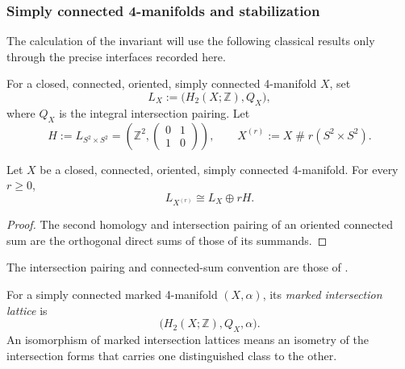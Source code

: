 \subsubsection{Simply connected 4-manifolds and stabilization}
\label{subsec:low-dimensional-topology}

The calculation of the invariant will use the following classical results
only through the precise interfaces recorded here.

\begin{definition}
\label{def:intersection-lattice-stabilization}
For a closed, connected, oriented, simply connected 4-manifold $X$, set
\[
  L_X:=\bigl(H_2(X;\mathbb Z),Q_X\bigr),
\]
where $Q_X$ is the integral intersection pairing.  Let
\[
  H:=L_{S^2\times S^2}
   =\left(\mathbb Z^2,
      \begin{pmatrix}0&1\\1&0\end{pmatrix}\right),
  \qquad
  X^{(r)}:=X\mathbin{\#}r(S^2\times S^2).
\]
\end{definition}

\begin{lemma}
\label{lem:intersection-lattice-stabilization}
Let \(X\) be a closed, connected, oriented, simply connected
4-manifold.  For every \(r\geq0\),
\[
  L_{X^{(r)}}\cong L_X\oplus rH.
\]
\end{lemma}

\begin{proof}
The second homology and intersection pairing of an oriented connected sum are
the orthogonal direct sums of those of its summands.
\end{proof}

\begin{remark}
\label{rem:intersection-form-conventions}
The intersection pairing and connected-sum convention are those of
\cite[Definition~1.2.1 and Section~1.3]{GompfStipsicz1999}.
\end{remark}

\begin{definition}
\label{def:marked-intersection-lattice}
For a simply connected marked 4-manifold $(X,\alpha)$, its
\emph{marked intersection lattice} is
\[
  \bigl(H_2(X;\mathbb Z),Q_X,\alpha\bigr).
\]
An isomorphism of marked intersection lattices means an isometry of the
intersection forms that carries one distinguished class to the other.
\end{definition}

